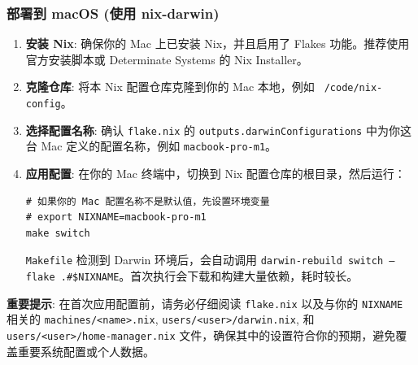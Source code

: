\documentclass[11pt, a4paper]{article} %
\begin{document}
\subsubsection{部署到 macOS (使用 nix-darwin)}
\begin{enumerate}[label=\textbf{\arabic*.}, wide, labelwidth=!, labelindent=0pt]
    \item \textbf{安装 Nix}: 确保你的 Mac 上已安装 Nix，并且启用了 Flakes 功能。推荐使用官方安装脚本或 Determinate Systems 的 Nix Installer。
    \item \textbf{克隆仓库}: 将本 Nix 配置仓库克隆到你的 Mac 本地，例如 \texttt{\string~/code/nix-config}。
    \item \textbf{选择配置名称}: 确认 \texttt{flake.nix} 的 \texttt{outputs.darwinConfigurations} 中为你这台 Mac 定义的配置名称，例如 \texttt{macbook-pro-m1}。
    \item \textbf{应用配置}: 在你的 Mac 终端中，切换到 Nix 配置仓库的根目录，然后运行：
        \begin{lstlisting}
# 如果你的 Mac 配置名称不是默认值，先设置环境变量
# export NIXNAME=macbook-pro-m1
make switch
        \end{lstlisting}
        \texttt{Makefile} 检测到 Darwin 环境后，会自动调用 \texttt{darwin-rebuild switch --flake .\#\$NIXNAME}。首次执行会下载和构建大量依赖，耗时较长。
\end{enumerate}
\textbf{重要提示}: 在首次应用配置前，请务必仔细阅读 \texttt{flake.nix} 以及与你的 \texttt{NIXNAME} 相关的 \texttt{machines/<name>.nix}, \texttt{users/<user>/darwin.nix}, 和 \texttt{users/<user>/home-manager.nix} 文件，确保其中的设置符合你的预期，避免覆盖重要系统配置或个人数据。
\end{document}
